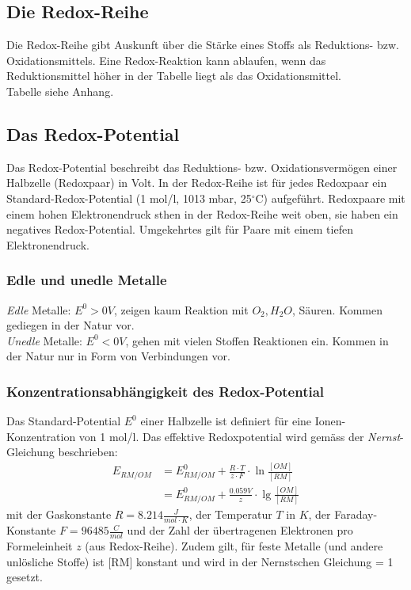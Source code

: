 \subsection{Die Redox-Reihe}
Die Redox-Reihe gibt Auskunft über die Stärke eines Stoffs als Reduktions- bzw. Oxidationsmittels. Eine Redox-Reaktion kann ablaufen, wenn das Reduktionsmittel höher in der Tabelle liegt als das Oxidationsmittel.\\

Tabelle siehe Anhang. \\

\subsection{Das Redox-Potential}
Das Redox-Potential beschreibt das Reduktions- bzw. Oxidationsvermögen einer Halbzelle (Redoxpaar) in Volt. In der Redox-Reihe ist für jedes Redoxpaar ein Standard-Redox-Potential (1 mol/l, 1013 mbar, 25$^\circ$C) aufgeführt. Redoxpaare mit einem hohen Elektronendruck sthen in der Redox-Reihe weit oben, sie haben ein negatives Redox-Potential. Umgekehrtes gilt für Paare mit einem tiefen Elektronendruck.\\

\subsubsection{Edle und unedle Metalle}
\emph{Edle} Metalle: $E^0 > 0V$, zeigen kaum Reaktion mit $O_2, H_2O$, Säuren. Kommen gediegen in der Natur vor. \\
\emph{Unedle} Metalle: $E^0 < 0V$, gehen mit vielen Stoffen Reaktionen ein. Kommen in der Natur nur in Form von Verbindungen vor. \\

\subsubsection{Konzentrationsabhängigkeit des Redox-Potential}
Das Standard-Potential $E^0$ einer Halbzelle ist definiert für eine Ionen-Konzentration von 1 mol/l. Das effektive Redoxpotential wird gemäss der \emph{Nernst}-Gleichung beschrieben:
\begin{eqnarray*}
	E_{RM/OM} &= E^0_{RM/OM} + \frac{R \cdot T}{z \cdot F} \cdot \ln\frac{[OM]}{[RM]} \\ &=  E^0_{RM/OM} + \frac{0.059V}{z} \cdot \lg\frac{[OM]}{[RM]}
\end{eqnarray*}
mit der Gaskonstante $R=8.214\frac{J}{mol \cdot K}$, der Temperatur $T$ in $K$, der Faraday-Konstante $F=96485\frac{C}{mol}$ und der Zahl der übertragenen Elektronen pro Formeleinheit $z$ (aus Redox-Reihe). Zudem gilt, für feste Metalle (und andere unlösliche Stoffe) ist [RM] konstant und wird in der Nernstschen Gleichung = 1 gesetzt. \\

